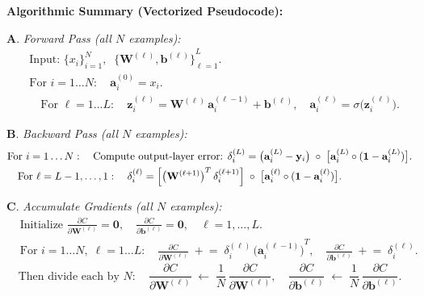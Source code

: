 \documentclass{article}
\begin{document}
\vspace{0.5em}
\noindent \textbf{Algorithmic Summary (Vectorized Pseudocode):}

\medskip
\noindent\(\mathbf{A.}\) \emph{Forward Pass (all \(N\) examples):}
\[
\begin{aligned}
    &\text{Input: } {\{x_{i}\}}_{i=1}^N,\;\;\{\mathbf{W}^{(\ell)},{\mathbf{b}^{(\ell)}\}}_{\ell=1}^L.\\
    &\text{For } i=1\ldots N:\quad
    \mathbf{a}_{i}^{(0)} = x_{i}.\\
    &\quad\text{For }\ell = 1\ldots L:\quad
    \mathbf{z}_{i}^{(\ell)} 
      = \mathbf{W}^{(\ell)}\,\mathbf{a}_{i}^{(\ell-1)} + \mathbf{b}^{(\ell)}, 
    \quad
    \mathbf{a}_{i}^{(\ell)} = \sigma\bigl(\mathbf{z}_{i}^{(\ell)}\bigr).
\end{aligned}
\]

\medskip
\noindent\(\mathbf{B.}\) \emph{Backward Pass (all \(N\) examples):}
\[
\begin{aligned}
    &\text{For } i=1\ldots N:\quad
    \text{Compute output-layer error: } 
    \delta_{i}^{(L)} 
    = \bigl(\mathbf{a}_{i}^{(L)} - \mathbf{y}_{i}\bigr)\;\circ\;\bigl[\mathbf{a}_{i}^{(L)} \circ (\mathbf{1} - \mathbf{a}_{i}^{(L)})\bigr].\\
    &\quad\text{For }\ell = L-1,\dots,1:\quad
    \delta_{i}^{(\ell)} 
      = \Bigl[{\bigl(\mathbf{W}^{(\ell+1)}\bigr)}^{T}\,\delta_{i}^{(\ell+1)}\Bigr]
        \;\circ\;\bigl[\mathbf{a}_{i}^{(\ell)} \circ (\mathbf{1} - \mathbf{a}_{i}^{(\ell)})\bigr].
\end{aligned}
\]

\medskip
\noindent\(\mathbf{C.}\) \emph{Accumulate Gradients (all \(N\) examples):}
\[
\begin{aligned}
    &\text{Initialize } 
    \frac{\partial C}{\partial \mathbf{W}^{(\ell)}} = \mathbf{0}, 
    \quad 
    \frac{\partial C}{\partial \mathbf{b}^{(\ell)}} = \mathbf{0}, 
    \quad \ell=1,\dots,L.\\
    &\text{For } i=1\ldots N,\;\ell=1\ldots L:\quad
    \frac{\partial C}{\partial \mathbf{W}^{(\ell)}} 
      \;+\!=\; \delta_{i}^{(\ell)}\,{\bigl(\mathbf{a}_{i}^{(\ell-1)}\bigr)}^{T}, 
    \quad
    \frac{\partial C}{\partial \mathbf{b}^{(\ell)}} 
      \;+\!=\; \delta_{i}^{(\ell)}.
\end{aligned}
\]
\[
    \text{Then divide each by }N: 
    \quad
    \frac{\partial C}{\partial \mathbf{W}^{(\ell)}} \;\leftarrow\; \frac{1}{N}\, \frac{\partial C}{\partial \mathbf{W}^{(\ell)}}, 
    \quad
    \frac{\partial C}{\partial \mathbf{b}^{(\ell)}} \;\leftarrow\; \frac{1}{N}\, \frac{\partial C}{\partial \mathbf{b}^{(\ell)}}.
\]
\end{document}
